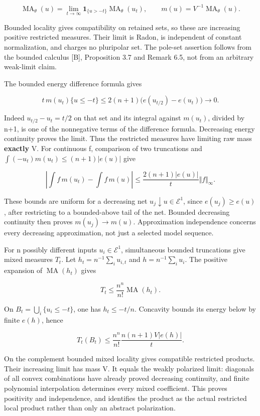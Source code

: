 \documentclass[11pt]{article}
\newcommand{\MA}{\operatorname{MA}}
\begin{document}
\[
\MA_\theta(u)=\lim_{t\to\infty}
\mathbf1_{\{u>-t\}}\MA_\theta(u_t),\qquad
m(u)=V^{-1}\MA_\theta(u).
\]

Bounded locality gives compatibility on retained sets, so these are increasing positive restricted measures. Their limit is Radon, is independent of constant normalization, and charges no pluripolar set. The pole-set assertion follows from the bounded calculus [B], Proposition 3.7 and Remark 6.5, not from an arbitrary weak-limit claim.

The bounded energy difference formula gives

\[
t\,m(u_t)\{u\leq-t\}
\leq2(n+1)\bigl(e(u_{t/2})-e(u_t)\bigr)\longrightarrow0.
\]

Indeed \(u_{t/2}-u_t=t/2\) on that set and its integral against \(m(u_t)\), divided by n+1, is one of the nonnegative terms of the difference formula. Decreasing energy continuity proves the limit. Thus the restricted measures have limiting raw mass \textbf{exactly} V. For continuous f, comparison of two truncations and \(\int(-u_t)m(u_t)\leq(n+1)|e(u)|\) give

\[
\left|\int f\,m(u_t)-\int f\,m(u)\right|
\leq\frac{2(n+1)|e(u)|}{t}\Vert f\Vert_\infty.
\]

These bounds are uniform for a decreasing net \(u_j\downarrow u\in\mathcal E^1\), since \(e(u_j)\geq e(u)\), after restricting to a bounded-above tail of the net. Bounded decreasing continuity then proves \(m(u_j)\to m(u)\). Approximation independence concerns every decreasing approximation, not just a selected model sequence.

For n possibly different inputs \(u_i\in\mathcal E^1\), simultaneous bounded truncations give mixed measures \(T_t\). Let \(h_t=n^{-1}\sum_i u_{i,t}\) and \(h=n^{-1}\sum_i u_i\). The positive expansion of \(\MA(h_t)\) gives

\[
T_t\leq\frac{n^n}{n!}\MA(h_t).
\]

On \(B_t=\bigcup_i\{u_i\leq-t\}\), one has \(h_t\leq-t/n\). Concavity bounds its energy below by finite \(e(h)\), hence

\[
T_t(B_t)\leq\frac{n^n}{n!}\frac{n(n+1)V|e(h)|}{t}.
\]

On the complement bounded mixed locality gives compatible restricted products. Their increasing limit has mass V. It equals the weakly polarized limit: diagonals of all convex combinations have already proved decreasing continuity, and finite polynomial interpolation determines every mixed coefficient. This proves positivity and independence, and identifies the product as the actual restricted local product rather than only an abstract polarization.
\end{document}
